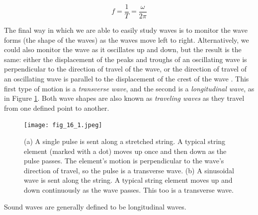 \begin{equation}
	f = \frac{1}{T} = \frac{\omega}{2\pi}
	\label{eq:physics-freq-eq}
\end{equation}

The final way in which we are able to easily study waves is to monitor the wave forms (the shape of the waves) as the waves move left to right. Alternatively, we could also monitor the wave as it oscillates up and down, but the result is the same: either the displacement of the peaks and troughs of an oscillating wave is perpendicular to the direction of travel of the wave, or the direction of travel of an oscillating wave is parallel to the displacement of the crest of the wave \cite{Halliday_Resnick_Walker_2005}. This first type of motion is a \textit{transverse wave}, and the second is a \textit{longitudinal wave}, as in Figure \ref{fig:transverse-wave-longitudinal-wave}. Both wave shapes are also known as \textit{traveling waves} as they travel from one defined point to another.

\begin{figure}[ht]
  \centering
  \texttt{[image: fig\_16\_1.jpeg]}
  \caption{(a) A single pulse is sent along a stretched string. A typical string element (marked with a dot) moves up once and then down as the pulse passes. The element’s motion is perpendicular to the wave’s direction of travel, so the pulse is a transverse wave. (b) A sinusoidal wave is sent along the string. A typical string element moves up and down continuously as the wave passes. This too is a transverse wave.}\cite{Halliday_Resnick_Walker_2005}
  \label{fig:transverse-wave-longitudinal-wave}
\end{figure}

Sound waves are generally defined to be longitudinal waves.


